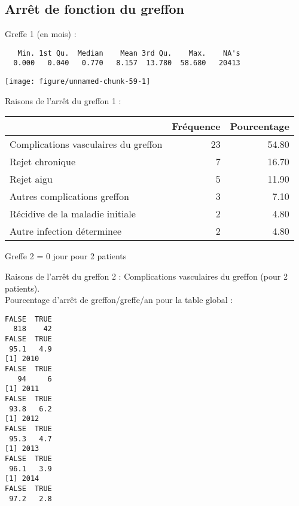 \documentclass[11pt,a4paper]{article}\usepackage[]{graphicx}\usepackage[]{color}
\makeatletter
\def\maxwidth{ %
  \ifdim\Gin@nat@width>\linewidth
    \linewidth
  \else
    \Gin@nat@width
  \fi
}
\newenvironment{kframe}{%
 \def\at@end@of@kframe{}%
 \ifinner\ifhmode%
  \def\at@end@of@kframe{\end{minipage}}%
  \begin{minipage}{\columnwidth}%
 \fi\fi%
 \def\FrameCommand##1{\hskip\@totalleftmargin \hskip-\fboxsep
 \colorbox{shadecolor}{##1}\hskip-\fboxsep
     \hskip-\linewidth \hskip-\@totalleftmargin \hskip\columnwidth}%
 \MakeFramed {\advance\hsize-\width
   \@totalleftmargin\z@ \linewidth\hsize
   \@setminipage}}%
 {\par\unskip\endMakeFramed%
 \at@end@of@kframe}
\newenvironment{knitrout}{}{} %
\makeatother
\begin{document}
  \subsection{Arrêt de fonction du greffon}

Greffe 1 (en mois) :
  
\begin{knitrout}
\color{fgcolor}\begin{kframe}
\begin{verbatim}
   Min. 1st Qu.  Median    Mean 3rd Qu.    Max.    NA's 
  0.000   0.040   0.770   8.157  13.780  58.680   20413 
\end{verbatim}
\end{kframe}
\texttt{[image: figure/unnamed-chunk-59-1]} 

\end{knitrout}

Raisons de l'arrêt du greffon 1 :
\begin{table}[H]
\centering
\begin{tabular}{lrr}
  \hline
 & Fréquence & Pourcentage \\ 
  \hline
Complications vasculaires du greffon &  23 & 54.80 \\ 
  Rejet chronique &   7 & 16.70 \\ 
  Rejet aigu &   5 & 11.90 \\ 
  Autres complications greffon &   3 & 7.10 \\ 
  Récidive de la maladie initiale &   2 & 4.80 \\ 
  Autre infection déterminee &   2 & 4.80 \\ 
   \hline
\end{tabular}
\end{table}


Greffe 2 = 0 jour pour 2 patients

Raisons de l'arrêt du greffon 2 : Complications vasculaires du greffon  (pour 2 patients).
~\\

Pourcentage d'arrêt de greffon/greffe/an pour la table global :

\begin{knitrout}
\color{fgcolor}\begin{kframe}
\begin{verbatim}
FALSE  TRUE 
  818    42 
FALSE  TRUE 
 95.1   4.9 
[1] 2010
FALSE  TRUE 
   94     6 
[1] 2011
FALSE  TRUE 
 93.8   6.2 
[1] 2012
FALSE  TRUE 
 95.3   4.7 
[1] 2013
FALSE  TRUE 
 96.1   3.9 
[1] 2014
FALSE  TRUE 
 97.2   2.8 
\end{verbatim}
\end{kframe}
\end{knitrout}
\end{document}
